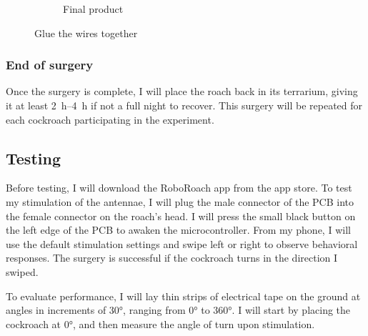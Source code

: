 \begin{figure}[ht!]
\begin{subfigure}{.49\textwidth}
    \caption{Final product}
    \label{fig:gluewires2}
    \end{subfigure}
\caption{Glue the wires together}
\label{fig:connectorC}
\end{figure}

\subsubsection{End of surgery}
Once the surgery is complete, I will place the roach back in its terrarium, giving it at least \SIrange{2}{4}{\hour} if not a full night to recover. This surgery will be repeated for each cockroach participating in the experiment.







\subsection{Testing}
Before testing, I will download the RoboRoach app from the app store. To test my stimulation of the antennae, I will plug the male connector of the PCB into the female connector on the roach's head. I will press the small black button on the
left edge of the PCB to awaken the microcontroller. From my phone, I will use the default stimulation settings and swipe left or right to observe behavioral responses. The surgery is successful if the cockroach turns in the direction I swiped.

To evaluate performance, I will lay thin strips of electrical tape on the ground at angles in increments of \ang{30}, ranging from \ang{0} to \ang{360}. I will start by placing the cockroach at \ang{0}, and then measure the angle of turn upon stimulation. 






















